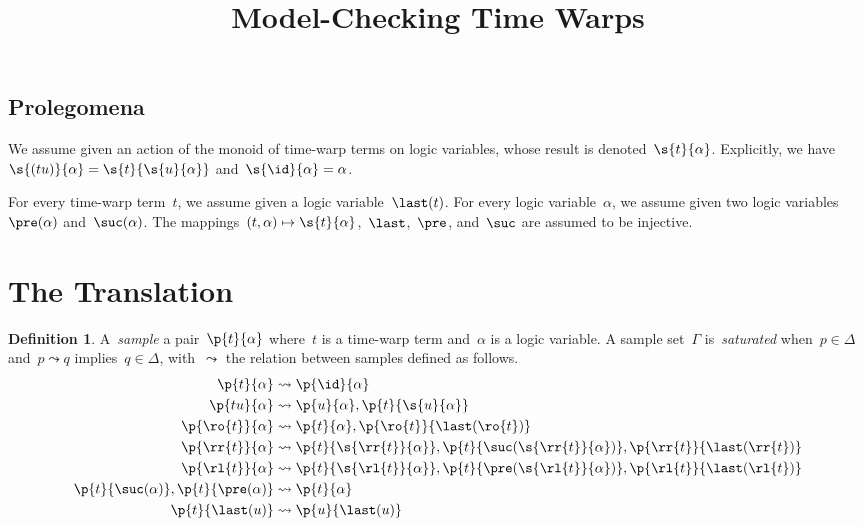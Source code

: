 \documentclass{scrartcl}
\title{Model-Checking Time Warps}
\author{}
\theoremstyle{definition}
\newtheorem{definition}{Definition}[section]
\begin{document}
\maketitle

\subsection{Prolegomena}


We assume given an action of the monoid of time-warp terms on logic variables,
whose result is denoted~$\s{t}{\alpha}$.
%
Explicitly, we have~$\s{(t u)}{\alpha} = \s{t}{\s{u}{\alpha}}$
and~$\s{\id}{\alpha} = \alpha$.

For every time-warp term~$t$, we assume given a logic variable~$\last(t)$.
%
For every logic variable~$\alpha$, we assume given two logic
variables~$\pre(\alpha)$ and~$\suc(\alpha)$.
%
The mappings~$(t, \alpha) \mapsto \s{t}{\alpha}$,~$\last$,~$\pre$, and~$\suc$
are assumed to be injective.

\section{The Translation}

\begin{definition}
  A~\emph{sample} a pair~$\p{t}{\alpha}$ where~$t$ is a time-warp term
  and~$\alpha$ is a logic variable.
  A sample set~$\Gamma$ is~\emph{saturated} when~$p \in \Delta$
  and~$p \leadsto q$ implies~$q \in \Delta$, with~$\leadsto$ the relation
  between samples defined as follows.
  \begin{align}
    \p{t}{\alpha}
    & \leadsto
    \p{\id}{\alpha}
    \\
    \p{tu}{\alpha}
    & \leadsto
    \p{u}{\alpha},
    \p{t}{\s{u}{\alpha}}
    \\
    \p{\ro{t}}{\alpha}
    & \leadsto
    \p{t}{\alpha},
    \p{\ro{t}}{\last(\ro{t})}
    \\
    \p{\rr{t}}{\alpha}
    & \leadsto
    \p{t}{\s{\rr{t}}{\alpha}},
    \p{t}{\suc(\s{\rr{t}}{\alpha})},
    \p{\rr{t}}{\last(\rr{t})}
    \\
    \p{\rl{t}}{\alpha}
    & \leadsto
    \p{t}{\s{\rl{t}}{\alpha}},
    \p{t}{\pre(\s{\rl{t}}{\alpha})},
    \p{\rl{t}}{\last(\rl{t})}
    \\
    \p{t}{\suc(\alpha)}, \p{t}{\pre(\alpha)}
    & \leadsto
    \p{t}{\alpha}
    \\
    \p{t}{\last(u)}
    & \leadsto
    \p{u}{\last(u)}
  \end{align}
\end{definition}
\end{document}
